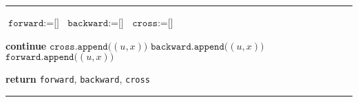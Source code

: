 \documentclass[14pt]{extreport}
\newenvironment{nocaptionalg} %
{
    \par\addvspace{\topsep}
    \centering
    \begin{minipage}{\linewidth}
    \hrule\kern2pt
}
{
    \par\kern2pt\hrule
    \end{minipage}
    \par\addvspace{\topsep}
}
\theoremstyle{definition}
\theoremstyle{definition}
\begin{document}
\begin{nocaptionalg}
    \begin{algorithmic}[1]
            \State $\texttt{forward} := \texttt{[]}$
            \State $\texttt{backward} := \texttt{[]}$
            \State $\texttt{cross} := \texttt{[]}$

                        \State \textbf{continue} 
                        \State $\texttt{cross.append(}(u, x)\texttt{)}$
                        \State $\texttt{backward.append(}(u, x)\texttt{)}$
                    \Else
                        \State $\texttt{forward.append(}(u, x)\texttt{)}$
                    \EndIf
                \EndFor
            \EndFor

            \State \textbf{return} \texttt{forward}, \texttt{backward}, \texttt{cross}
        \EndFunction
    \end{algorithmic}
\end{nocaptionalg}
\end{document}
